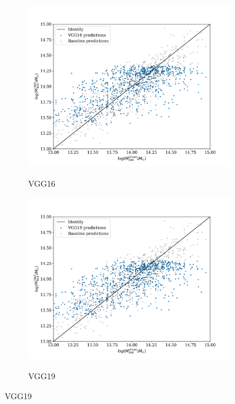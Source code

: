 \begin{figure}[H]
\centering
\begin{subfigure}{.325\textwidth}
    \centering
    \includegraphics[width=\linewidth]{images/Chapter4/Results/test_VGG16_scatter.png}
    \label{fig:test_VGG16_scatter}
    \caption{VGG16}
\end{subfigure}
\begin{subfigure}{.325\textwidth}
    \centering
    \includegraphics[width=\linewidth]{images/Chapter4/Results/test_VGG19_scatter.png}
    \label{fig:test_VGG19_scatter}
    \caption{VGG19}
\end{subfigure}

\end{figure}
